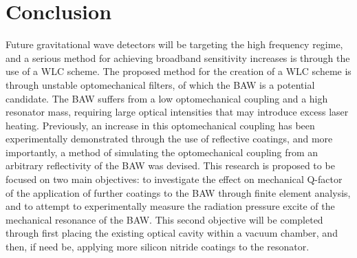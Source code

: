 \documentclass[aps,  
                a4paper, 
                amsmath, 
                amssymb, 
                preprint,
                tightenlines,  
                amsfonts,
                nofootinbib,
                onecolumn,
                titlepage,
                10pt
            ]{revtex4-2}
\begin{document}
    \section{Conclusion}
    Future gravitational wave detectors will be targeting the high frequency regime, and a serious method for achieving broadband sensitivity increases is through the use of a WLC scheme. The proposed method for the creation of a WLC scheme is through unstable optomechanical filters, of which the BAW is a potential candidate. The BAW suffers from a low optomechanical coupling and a high resonator mass, requiring large optical intensities that may introduce excess laser heating. Previously, an increase in this optomechanical coupling has been experimentally demonstrated through the use of reflective coatings, and more importantly, a method of simulating the optomechanical coupling from an arbitrary reflectivity of the BAW was devised. This research is proposed to be focused on two main objectives: to investigate the effect on mechanical Q-factor of the application of further coatings to the BAW through finite element analysis, and to attempt to experimentally measure the radiation pressure excite of the mechanical resonance of the BAW. This second objective will be completed through first placing the existing optical cavity within a vacuum chamber, and then, if need be, applying more silicon nitride coatings to the resonator. 

    \newpage
    \nocite{*}
    
    
\end{document}
